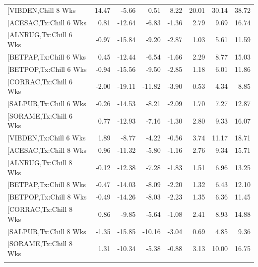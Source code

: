 \documentclass{article}\usepackage[]{graphicx}\usepackage[]{color}
\begin{document}
\begin{longtable}{lrrrrrrr}
  [VIBDEN,Chill 8 Wks & 14.47 & -5.66 & 0.51 & 8.22 & 20.01 & 30.14 & 38.72 \\ 
  [ACESAC,Tx:Chill 6 Wks & 0.81 & -12.64 & -6.83 & -1.36 & 2.79 & 9.69 & 16.74 \\ 
  [ALNRUG,Tx:Chill 6 Wks & -0.97 & -15.84 & -9.20 & -2.87 & 1.03 & 5.61 & 11.59 \\ 
  [BETPAP,Tx:Chill 6 Wks & 0.45 & -12.44 & -6.54 & -1.66 & 2.29 & 8.77 & 15.03 \\ 
  [BETPOP,Tx:Chill 6 Wks & -0.94 & -15.56 & -9.50 & -2.85 & 1.18 & 6.01 & 11.86 \\ 
  [CORRAC,Tx:Chill 6 Wks & -2.00 & -19.11 & -11.82 & -3.90 & 0.53 & 4.34 & 8.85 \\ 
  [SALPUR,Tx:Chill 6 Wks & -0.26 & -14.53 & -8.21 & -2.09 & 1.70 & 7.27 & 12.87 \\ 
  [SORAME,Tx:Chill 6 Wks & 0.77 & -12.93 & -7.16 & -1.30 & 2.80 & 9.33 & 16.07 \\ 
  [VIBDEN,Tx:Chill 6 Wks & 1.89 & -8.77 & -4.22 & -0.56 & 3.74 & 11.17 & 18.71 \\ 
  [ACESAC,Tx:Chill 8 Wks & 0.96 & -11.32 & -5.80 & -1.16 & 2.76 & 9.34 & 15.71 \\ 
  [ALNRUG,Tx:Chill 8 Wks & -0.12 & -12.38 & -7.28 & -1.83 & 1.51 & 6.96 & 13.25 \\ 
  [BETPAP,Tx:Chill 8 Wks & -0.47 & -14.03 & -8.09 & -2.20 & 1.32 & 6.43 & 12.10 \\ 
  [BETPOP,Tx:Chill 8 Wks & -0.49 & -14.26 & -8.03 & -2.23 & 1.35 & 6.36 & 11.45 \\ 
  [CORRAC,Tx:Chill 8 Wks & 0.86 & -9.85 & -5.64 & -1.08 & 2.41 & 8.93 & 14.88 \\ 
  [SALPUR,Tx:Chill 8 Wks & -1.35 & -15.85 & -10.16 & -3.04 & 0.69 & 4.85 & 9.36 \\ 
  [SORAME,Tx:Chill 8 Wks & 1.31 & -10.34 & -5.38 & -0.88 & 3.13 & 10.00 & 16.75 \\ 
   \hline
\hline
\label{tab:suppmodthick}
\end{longtable}
\end{document}
